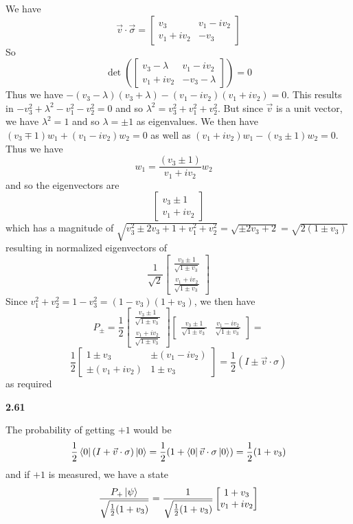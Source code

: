 We have \[\vec{v}\cdot \vec{\sigma} =\begin{bmatrix}
    v_3 & v_1-iv_2 \\
    v_1 + i v_2 & -v_3
\end{bmatrix}\]
So 
\[\det\left(\begin{bmatrix}
    v_3-\lambda & v_1-iv_2 \\
    v_1 + i v_2 & -v_3-\lambda
\end{bmatrix}\right)= 0\]Thus we have 
$-(v_3-\lambda)(v_3 + \lambda) - (v_1-iv_2)(v_1+iv_2) = 0$. This results in $ -v_3^2 +\lambda^2 - v_1^2 -v_2^2 = 0 $ and so $ \lambda^2 =v_3^2  +v_1^2 +v_2^2$. But since $ \vec{v}$ is a unit vector, we have $ \lambda^2 = 1$ and so $\lambda = \pm 1$ as eigenvalues. We then have $( v_3\mp 1)w_1 + (v_1-iv_2)w_2 = 0$ as well as $ (v_1+iv_2)w_1 - (v_3\pm1)w_2 = 0 $. Thus we have \[w_1 = \frac{(v_3 \pm 1)}{v_1 + iv_2}w_2 \quad \] and so the eigenvectors are
\[\begin{bmatrix}
    v_3 \pm 1\\
    v_1 + iv_2
\end{bmatrix}\] 
which has a magnitude of $\sqrt{v_3^2 \pm2v_3 + 1 +v_1^2 + v_2^2} = \sqrt{\pm 2v_3 + 2} = \sqrt{2(1\pm v_3)}$ resulting in normalized eigenvectors of 
\[\renewcommand{\arraystretch}{1.5}\frac{1}{\sqrt{2}}\begin{bmatrix}
    \frac{v_3 \pm 1}{\sqrt{1\pm v_3}}\\
    \frac{v_1 + iv_2}{\sqrt{1\pm v_3}}
\end{bmatrix}\] 
Since $ v_1^2 + v_2^2 = 1-v_3^2 = (1-v_3)(1+v_3)$, we then have  
\[\renewcommand{\arraystretch}{1.5}P_\pm = \frac{1}{2}\begin{bmatrix}
    \frac{v_3 \pm 1}{\sqrt{1\pm v_3}}\\
    \frac{v_1 + iv_2}{\sqrt{1\pm v_3}}
\end{bmatrix}
\begin{bmatrix}
    \frac{v_3 \pm 1}{\sqrt{1\pm v_3}}&
    \frac{v_1 - iv_2}{\sqrt{1\pm v_3}}
\end{bmatrix} =\]\[
\frac{1}{2}\begin{bmatrix}
    1\pm v_3&
    \pm (v_1 - iv_2) \\
    \pm (v_1 + iv_2) & 1\pm v_3
\end{bmatrix} =\frac{1}{2}\left(I\pm \vec{v}\cdot \sigma\right)\]
as required

\textbf{2.61}

The probability of getting $+1$ would be \[\frac{1}{2}\bra{0}\left(I + \vec{v}\cdot \sigma\right)\ket{0} = \frac{1}{2}(1 +\bra{0}\vec{v}\cdot \sigma\ket{0}) =\frac{1}{2}(1 + v_3) \]
and if $+1$ is measured, we have a state
\[\frac{P_+\ket{\psi}}{\sqrt{\frac{1}{2}(1 + v_3)}} = \frac{1}{\sqrt{\frac{1}{2}(1+v_3)}}
\begin{bmatrix}
1+ v_3 \\ v_1 + iv_2
\end{bmatrix}\]

